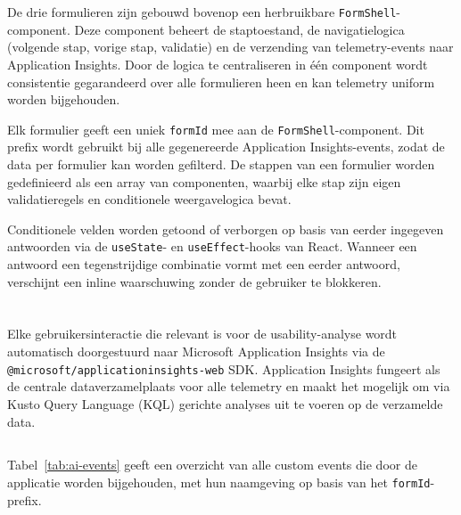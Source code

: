 \section{}

De drie formulieren zijn gebouwd bovenop een herbruikbare \texttt{FormShell}-component. Deze component beheert de staptoestand, de navigatielogica (volgende stap, vorige stap, validatie) en de verzending van telemetry-events naar Application Insights. Door de logica te centraliseren in één component wordt consistentie gegarandeerd over alle formulieren heen en kan telemetry uniform worden bijgehouden.

Elk formulier geeft een uniek \texttt{formId} mee aan de \texttt{FormShell}-component. Dit prefix wordt gebruikt bij alle gegenereerde Application Insights-events, zodat de data per formulier kan worden gefilterd. De stappen van een formulier worden gedefinieerd als een array van componenten, waarbij elke stap zijn eigen validatieregels en conditionele weergavelogica bevat.

Conditionele velden worden getoond of verborgen op basis van eerder ingegeven antwoorden via de \texttt{useState}- en \texttt{useEffect}-hooks van React. Wanneer een antwoord een tegenstrijdige combinatie vormt met een eerder antwoord, verschijnt een inline waarschuwing zonder de gebruiker te blokkeren.

\section{}

Elke gebruikersinteractie die relevant is voor de usability-analyse wordt automatisch doorgestuurd naar Microsoft Application Insights via de \texttt{@microsoft/applicationinsights-web} SDK. Application Insights fungeert als de centrale dataverzamelplaats voor alle telemetry en maakt het mogelijk om via Kusto Query Language (KQL) gerichte analyses uit te voeren op de verzamelde data.

\subsection{}

Tabel~\ref{tab:ai-events} geeft een overzicht van alle custom events die door de applicatie worden bijgehouden, met hun naamgeving op basis van het \texttt{formId}-prefix.

